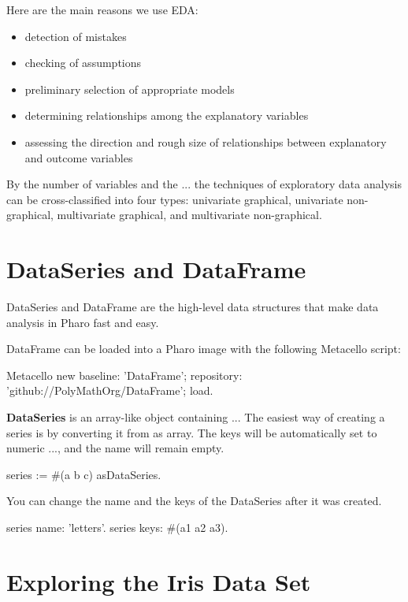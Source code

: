 \documentclass{article}
\begin{document}
\begin{multicols}{2}
Here are the main reasons we use EDA:
\begin{itemize}
  \item detection of mistakes
  \item checking of assumptions
  \item preliminary selection of appropriate models
  \item determining relationships among the explanatory variables
  \item assessing the direction and rough size of relationships between explanatory and outcome variables
\end{itemize}

By the number of variables and the ... the techniques of exploratory data analysis can be cross-classified into four types: univariate graphical, univariate non-graphical, multivariate graphical, and multivariate non-graphical.

\section{DataSeries and DataFrame}
\label{sec:dataframe}
DataSeries and DataFrame are the high-level data structures that make data analysis in Pharo fast and easy.
\cite{McKinney}

DataFrame can be loaded into a Pharo image with the following Metacello script:
\begin{code}{}
Metacello new
  baseline: 'DataFrame';
  repository: 'github://PolyMathOrg/DataFrame';
  load.
\end{code}

\textbf{DataSeries} is an array-like object containing ...
The easiest way of creating a series is by converting it from as array. The keys will be automatically set to numeric ..., and the name will remain empty. 

\begin{code}{}
series := #(a b c) asDataSeries.
\end{code}

You can change the name and the keys of the DataSeries after it was created.

\begin{code}{}
series name: 'letters'.
series keys: #(a1 a2 a3).
\end{code}

\section{Exploring the Iris Data Set}
\label{sec:contribution}
%
%


\end{multicols}
\end{document}

